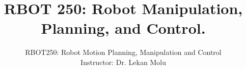 \documentclass[doublespacing]{brandeis}
\author{RBOT250: Robot Motion Planning, Manipulation and Control \\
	Instructor: Dr. Lekan Molu}
\title{RBOT 250: Robot Manipulation, Planning, and Control.
}
\numberwithin{equation}{section}
\theoremstyle{definition}
\begin{document}
	
	\frontmatter
	
	
	\tableofcontents
	\listoffigures %
	\listoftables %
	
	\mainmatter
%



\newpage




%



%
\providecommand\BIBentryALTinterwordstretchfactor{2.5}

%

\end{document}
